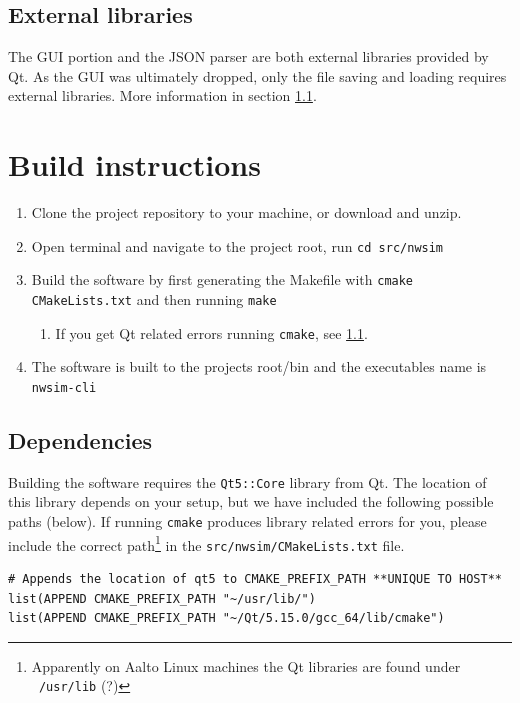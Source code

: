 \subsection{External libraries}
The GUI portion and the JSON parser are both external libraries provided by Qt. As the GUI was ultimately dropped, only the file saving and loading requires external libraries. More information in section \ref{sec:dependencies}.

\section{Build instructions}

\begin{enumerate}
    \item Clone the project repository to your machine, or download and unzip.
    \item Open terminal and navigate to the project root, run \texttt{cd src/nwsim}
    \item Build the software by first generating the Makefile with \texttt{cmake CMakeLists.txt} and then running \texttt{make}
    \begin{enumerate}
        \item If you get Qt related errors running \texttt{cmake}, see \ref{sec:dependencies}.
    \end{enumerate}
    \item The software is built to the projects root/bin and the executables name is \texttt{nwsim-cli}
\end{enumerate}

\subsection{Dependencies} \label{sec:dependencies}
Building the software requires the \texttt{Qt5::Core} library from Qt. The location of this library depends on your setup, but we have included the following possible paths (below). If running \texttt{cmake} produces library related errors for you, please include the correct path\footnote{Apparently on Aalto Linux machines the Qt libraries are found under \texttt{~/usr/lib} (?)} in the \texttt{src/nwsim/CMakeLists.txt} file. 
\lstset{basicstyle=\scriptsize,numbers=left}
\begin{lstlisting}[firstnumber=3]
# Appends the location of qt5 to CMAKE_PREFIX_PATH **UNIQUE TO HOST**
list(APPEND CMAKE_PREFIX_PATH "~/usr/lib/")
list(APPEND CMAKE_PREFIX_PATH "~/Qt/5.15.0/gcc_64/lib/cmake")
\end{lstlisting}

